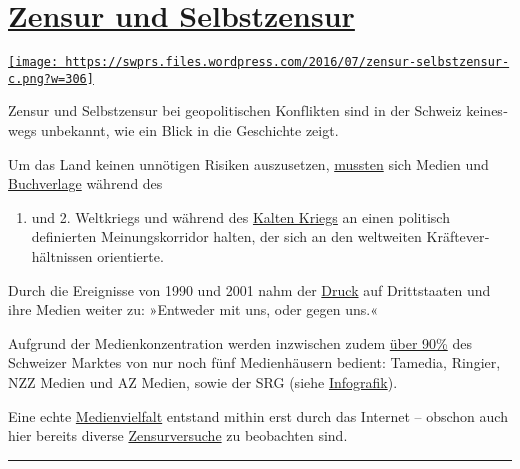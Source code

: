 \hypertarget{zensur-und-selbstzensur}{%
\section{\texorpdfstring{\href{https://swprs.org/2017/03/01/zensur-in-schweizer-medien/}{Zensur
und
Selbstzensur}}{Zensur und Selbstzensur}}\label{zensur-und-selbstzensur}}

\href{https://swprs.org/2017/03/01/zensur-in-schweizer-medien/}{\texttt{[image: https://swprs.files.wordpress.com/2016/07/zensur-selbstzensur-c.png?w=306]}}

Zensur und Selbst­zensur bei geo­po­li­tischen Kon­f‌lik­ten sind in der
Schweiz keines­wegs un­be­kannt, wie ein Blick in die Ge­schichte zeigt.

Um das Land keinen un­nöti­gen Ri­si­ken aus­zu­setzen,
\href{http://www.amazon.de/Selbstzensur-schweizerische-Pressepolitik-Zweiten-Weltkrieg/dp/3719304566}{muss­ten}
sich Medien und
\href{https://www.chronos-verlag.ch/node/20528}{Buch­ver­lage} wäh­rend
des

\begin{enumerate}
\def\labelenumi{\arabic{enumi}.}
\tightlist
\item
  und 2. Welt­kriegs und während des
  \href{http://www.swissinfo.ch/ger/das-ende-eines-nationalen-maenner-netzwerks/4205194}{Kal­ten
  Kriegs} an einen po­li­tisch definierten Mei­nungs­korri­dor halten,
  der sich an den welt­wei­ten Kräfte­ver­hält­nissen orientierte.
\end{enumerate}

Durch die Ereignisse von 1990 und 2001 nahm der
\href{https://www.youtube.com/watch?v=a4eGtXFDFJA}{Druck} auf
Drittstaaten und ihre Medien wei­ter zu: »Entweder mit uns, oder gegen
uns.«

Aufgrund der Medien­kon­zen­tration werden in­zwi­schen zudem
\href{https://swprs.files.wordpress.com/2018/03/broschur_jahrbuch_foeg_deutsch_2015.pdf\#page=13}{über
90\%} des Schwei­zer Mark­tes von nur noch fünf Medien­häusern bedient:
Tamedia, Ringier, NZZ Medien und AZ Medien, sowie der SRG (siehe
\href{https://swprs.org/netzwerk-medien-schweiz/}{Info­grafik}).

Eine echte \href{https://swprs.org/medien-navigator/}{Medienvielfalt}
entstand mithin erst durch das Internet -- obschon auch hier bereits
diverse
\href{https://www.heise.de/tp/features/Facebook-Fake-News-und-die-Privatisierung-der-Zensur-3599878.html}{Zensurversuche}
zu beobachten sind.

\begin{center}\rule{0.5\linewidth}{\linethickness}\end{center}

